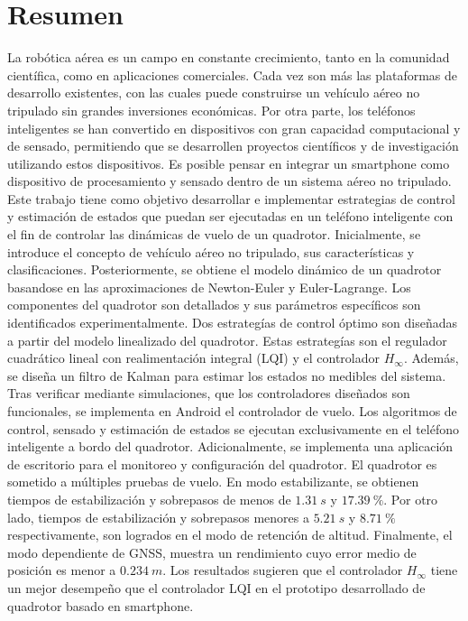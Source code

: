 \newpage
\thispagestyle{empty}
\mbox{}

\chapter*{Resumen} \label{resumen}
\vspace{-0.2cm}
La robótica aérea es un campo en constante crecimiento, tanto en la comunidad científica, como en aplicaciones comerciales. Cada vez son más las plataformas de desarrollo existentes, con las cuales puede construirse un vehículo aéreo no tripulado sin grandes inversiones económicas. Por otra parte, los teléfonos inteligentes se han convertido en dispositivos con gran capacidad computacional y de sensado, permitiendo que se desarrollen proyectos científicos y de investigación utilizando estos dispositivos. Es posible pensar en integrar un smartphone como dispositivo de procesamiento y sensado dentro de un sistema aéreo no tripulado. 
\\
Este trabajo tiene como objetivo desarrollar e implementar estrategias de control y estimación de estados que puedan ser ejecutadas en un teléfono inteligente con el fin de controlar las dinámicas de vuelo de un quadrotor. Inicialmente, se introduce el concepto de vehículo aéreo no tripulado, sus características y clasificaciones. Posteriormente, se obtiene el modelo dinámico de un quadrotor basandose en las aproximaciones de Newton-Euler y Euler-Lagrange. Los componentes del quadrotor son detallados y sus parámetros específicos son identificados experimentalmente. Dos estrategías de control óptimo son diseñadas a partir del modelo linealizado del quadrotor. Estas estrategías son el regulador cuadrático lineal con realimentación integral (LQI) y el controlador $H_\infty$. Además, se diseña un filtro de Kalman para estimar los estados no medibles del sistema. Tras verificar mediante simulaciones, que los controladores diseñados son funcionales, se implementa en Android el controlador de vuelo. Los algoritmos de control, sensado y estimación de estados se ejecutan exclusivamente en el teléfono inteligente a bordo del quadrotor. Adicionalmente, se implementa una aplicación de escritorio para el monitoreo y configuración del quadrotor. El quadrotor es sometido a múltiples pruebas de vuelo. En modo estabilizante, se obtienen tiempos de estabilización y sobrepasos de menos de $1.31\ s$ y $17.39\ \%$. Por otro lado, tiempos de estabilización y sobrepasos menores a $5.21\ s$ y $8.71\ \%$ respectivamente, son logrados en el modo de retención de altitud. Finalmente, el modo dependiente de GNSS, muestra un rendimiento cuyo error medio de posición es menor a $0.234\ m$. Los resultados sugieren que el controlador $H_\infty$ tiene un mejor desempeño que el controlador LQI en el prototipo desarrollado de quadrotor basado en smartphone.
\\\\
